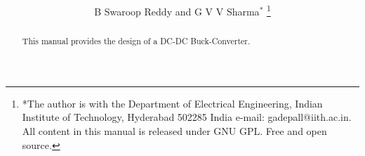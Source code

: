 \documentclass[journal,12pt,twocolumn]{IEEEtran}
\begin{document}









\def\putbox#1#2#3{\makebox[0in][l]{\makebox[#1][l]{}\raisebox{\baselineskip}[0in][0in]{\raisebox{#2}[0in][0in]{#3}}}}
     \def\rightbox#1{\makebox[0in][r]{#1}}
     \def\centbox#1{\makebox[0in]{#1}}
     \def\topbox#1{\raisebox{-\baselineskip}[0in][0in]{#1}}
     \def\midbox#1{\raisebox{-0.5\baselineskip}[0in][0in]{#1}}

\vspace{3cm}

\title{ 
}

\author{B Swaroop Reddy and  G V V Sharma$^{*}$%
	\thanks{*The author is with the Department
		of Electrical Engineering, Indian Institute of Technology, Hyderabad
		502285 India e-mail:  gadepall@iith.ac.in. All content in this manual is released under GNU GPL.  Free and open source.}
	
}	

\maketitle

\tableofcontents
\bigskip

\begin{abstract}
	
	This manual provides the design of a DC-DC Buck-Converter.
	
\end{abstract}

\end{document}
